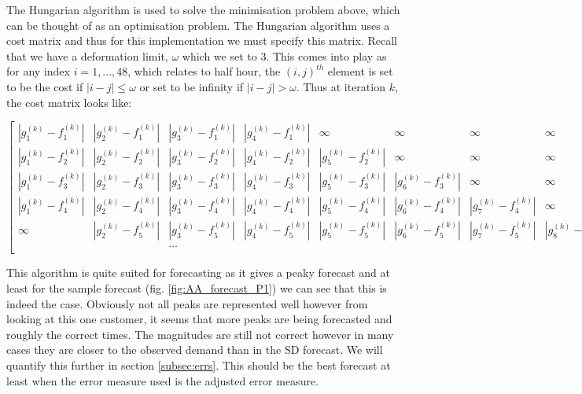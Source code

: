 The Hungarian algorithm is used to solve the minimisation problem above, which can be thought of as an optimisation problem. The Hungarian algorithm uses a cost matrix and thus for this implementation we must specify this matrix. Recall that we have a deformation limit, $\omega$ which we set to 3. This comes into play as for any index $i = 1, ..., 48$, which relates to half hour, the $(i,j)^{th}$ element is set to be the cost if $|i-j|\le\omega$ or set to be infinity if $|i-j| > \omega$. Thus at iteration $k$, the cost matrix looks like: \newline

\begin{tiny}\centerline{$\begin{bmatrix}
    |g_1^{(k)} - f_1^{(k)}| & |g_2^{(k)} - f_1^{(k)}| & |g_3^{(k)} - f_1^{(k)}| & |g_4^{(k)} -f_1^{(k)}| & \infty  & \infty& \infty & \infty & \dots & \infty \\
    |g_1^{(k)} - f_2^{(k)}| & |g_2^{(k)} - f_2^{(k)}| & |g_3^{(k)} - f_2^{(k)}| &  |g_4^{(k)} - f_2^{(k)}| & |g_5^{(k)} - f_2^{(k)}| & \infty & \infty &\infty & \dots & \infty\\
    |g_1^{(k)} - f_3^{(k)}| & |g_2^{(k)} - f_3^{(k)}| & |g_3^{(k)} - f_3^{(k)}| &  |g_4^{(k)} - f_3^{(k)}|& |g_5^{(k)}- f_3^{(k)}| & |g_6^{(k)}-f_3^{(k)}| & \infty & \infty & \dots  & \infty\\
    |g_1^{(k)}-f_4^{(k)}| & |g_2^{(k)} - f_4^{(k)}| & |g_3^{(k)} - f_4^{(k)}| & |g_4^{(k)} - f_4^{(k)}| &  |g_5^{(k)} - f_4^{(k)}| & |g_6^{(k)}- f_4^{(k)}|& |g_7^{(k)} - f_4^{(k)}| &\infty &\dots & \infty\\
    \infty & |g_2^{(k)} - f_5^{(k)}| & |g_3^{(k)} - f_5^{(k)}| & |g_4^{(k)} - f_5^{(k)}| &  |g_5^{(k)} - f_5^{(k)}|& |g_6^{(k)}- f_5^{(k)}|& |g_7^{(k)} - f_5^{(k)}| &|g_8^{(k)} - f_5^{(k)}| &\dots & \infty\\
     &  & \dots &  & &  & &  & \\
\end{bmatrix}$} \end{tiny}

This algorithm is quite suited for forecasting as it gives a peaky forecast and at least for the sample forecast (fig. \ref{fig:AA_forecast_P1}) we can see that this is indeed the case. Obviously not all peaks are represented well however from looking at this one customer, it seems that more peaks are being forecasted and roughly the correct times. The magnitudes are still not correct however in many cases they are closer to the observed demand than in the SD forecast. We will quantify this further in section \ref{subsec:errs}. This should be the best forecast at least when the error measure used is the adjusted error measure.


